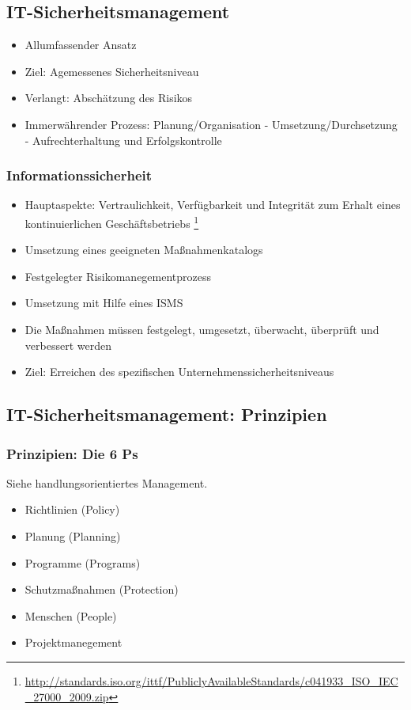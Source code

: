 \subsection{IT-Sicherheitsmanagement}
\begin{itemize}
	\item Allumfassender Ansatz
	\item Ziel: Agemessenes Sicherheitsniveau
	\item Verlangt: Abschätzung des Risikos
	\item Immerwährender Prozess: Planung/Organisation - Umsetzung/Durchsetzung - Aufrechterhaltung und Erfolgskontrolle
\end{itemize}

\subsubsection{Informationssicherheit}
\begin{itemize}
	\item Hauptaspekte: Vertraulichkeit, Verfügbarkeit und Integrität zum Erhalt eines kontinuierlichen Geschäftsbetriebs
	\footnote{\url{http://standards.iso.org/ittf/PubliclyAvailableStandards/c041933_ISO_IEC_27000_2009.zip}}
	\item Umsetzung eines geeigneten Maßnahmenkatalogs
	\item Festgelegter Risikomanegementprozess
	\item Umsetzung mit Hilfe eines ISMS
	\item Die Maßnahmen müssen festgelegt, umgesetzt, überwacht, überprüft und verbessert werden
	\item Ziel: Erreichen des spezifischen Unternehmenssicherheitsniveaus
\end{itemize}


\subsection{IT-Sicherheitsmanagement: Prinzipien}

\subsubsection{Prinzipien: Die 6 Ps}
Siehe handlungsorientiertes Management.
\begin{itemize}
	\item Richtlinien (Policy)
	\item Planung (Planning)
	\item Programme (Programs)
	\item Schutzmaßnahmen (Protection)
	\item Menschen (People)
	\item Projektmanegement
\end{itemize}

